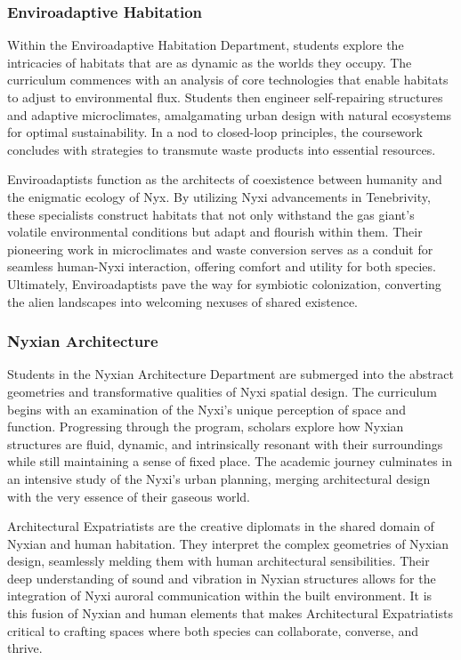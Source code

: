 \subsubsection{Enviroadaptive Habitation}
Within the Enviroadaptive Habitation Department, students explore the
intricacies of habitats that are as dynamic as the worlds they occupy. The
curriculum commences with an analysis of core technologies that enable habitats
to adjust to environmental flux. Students then engineer self-repairing
structures and adaptive microclimates, amalgamating urban design with natural
ecosystems for optimal sustainability. In a nod to closed-loop principles, the
coursework concludes with strategies to transmute waste products into essential
resources.

Enviroadaptists function as the architects of coexistence between humanity and
the enigmatic ecology of Nyx. By utilizing Nyxi advancements in Tenebrivity,
these specialists construct habitats that not only withstand the gas giant's
volatile environmental conditions but adapt and flourish within them. Their
pioneering work in microclimates and waste conversion serves as a conduit for
seamless human-Nyxi interaction, offering comfort and utility for both species.
Ultimately, Enviroadaptists pave the way for symbiotic colonization, converting
the alien landscapes into welcoming nexuses of shared existence.

\subsubsection{Nyxian Architecture}
Students in the Nyxian Architecture Department are submerged into the abstract
geometries and transformative qualities of Nyxi spatial design. The curriculum
begins with an examination of the Nyxi's unique perception of space and
function. Progressing through the program, scholars explore how Nyxian
structures are fluid, dynamic, and intrinsically resonant with their
surroundings while still maintaining a sense of fixed place. The academic
journey culminates in an intensive study of the Nyxi's urban planning, merging
architectural design with the very essence of their gaseous world.

Architectural Expatriatists are the creative diplomats in the shared domain of
Nyxian and human habitation. They interpret the complex geometries of Nyxian
design, seamlessly melding them with human architectural sensibilities. Their
deep understanding of sound and vibration in Nyxian structures allows for the
integration of Nyxi auroral communication within the built environment. It is
this fusion of Nyxian and human elements that makes Architectural Expatriatists
critical to crafting spaces where both species can collaborate, converse, and
thrive.

